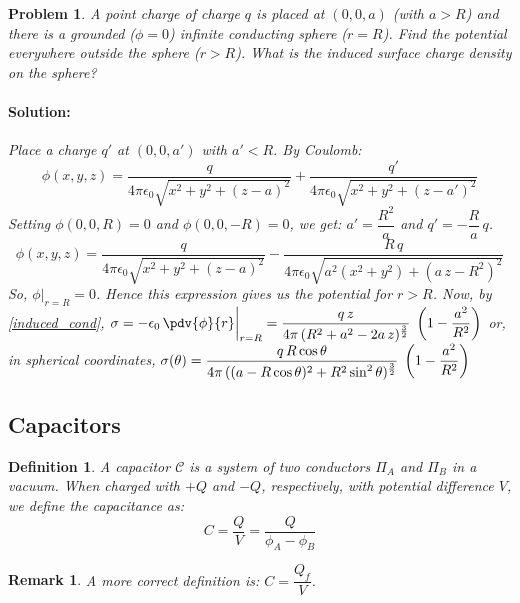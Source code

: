 \documentclass[12pt]{article}
\newcommand*{\ee}{\epsilon_0}
\newtheorem{definition}[theorem]{Definition}
\newtheorem{remark}[theorem]{Remark}
\newtheorem{problem}[theorem]{Problem}
\newenvironment{solution}{\paragraph{Solution:}}{\hfill}
\begin{document}
\begin{problem}
  A point charge of charge $q$ is placed at $(0,0,a)$ (with $a>R$) and there is a grounded ($\phi=0$) infinite conducting sphere ($r=R$). Find the potential everywhere outside the sphere ($r>R$). What is the induced surface charge density on the sphere?
  \begin{solution}
    Place a charge $q'$ at $(0,0,a')$  with $a'<R$. By Coulomb: $$\phi(x,y,z)=\frac{q}{4\pi\ee\sqrt{x^2+y^2+(z-a)^2}}+\frac{q'}{4\pi\ee\sqrt{x^2+y^2+(z-a')^2}}$$ Setting $\phi(0,0,R)=0$ and $\phi(0,0,-R)=0$, we get: $a'=\dfrac{R^2}{a}$ and $q'=-\dfrac{R}{a}\,q$. $$\phi(x,y,z)=\frac{q}{4\pi\ee\sqrt{x^2+y^2+(z-a)^2}}-\frac{R\,q}{4\pi\ee\sqrt{a^2(x^2+y^2)+(a\,z-R^2)^2}}$$
    So, $\phi\big|_{r=R}=0$. Hence this expression gives us the potential for $r>R$. Now, by \ref{induced_cond}, $\displaystyle\sigma=-\ee\,\pdv{\phi}{r}\bigg|_{r=R}=\frac{q\,z}{4\pi\,(R^2+a^2-2a\,z)^{3\over 2}}\;\left(1-\frac{a^2}{R^2}\right)$ or, in spherical coordinates, $\displaystyle\sigma(\theta)=\frac{q\,R\cos{\theta}}{4\pi\,((a-R\cos{\theta})^2+R^2\sin^2{\theta})^{3\over 2}}\;\left(1-\frac{a^2}{R^2}\right)$
  \end{solution}
\end{problem}

\pagebreak

\subsection{Capacitors}

\begin{definition}
  \label{def_capacitor}
  A capacitor $\mathcal{C}$ is a system of two conductors $\Pi_A$ and $\Pi_B$ in a vacuum. When charged with $+Q$ and $-Q$, respectively, with potential difference $V$, we define the capacitance as: $$C=\frac{Q}{V}=\frac{Q}{\phi_A-\phi_B}$$
\end{definition}

\begin{remark}
  A more correct definition is: $C=\dfrac{Q_f}{V}$.
\end{remark}
\end{document}
